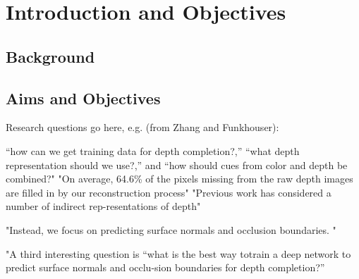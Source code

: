 

\chapter{Introduction and Objectives}
\label{Intro} 
\lipsum[1]


\section{Background}
\lipsum[1]


\section{Aims and Objectives}
Research questions go here, e.g. (from Zhang and Funkhouser):  
 
 “how can we get training data for depth completion?,”  “what depth representation should we use?,” and “how should cues from color and depth be combined?" 
 "On average, 64.6\% of the pixels missing from the raw depth images are filled in by our reconstruction process"
 "Previous work has considered a number of indirect rep-resentations  of  depth"  
  
 "Instead,  we  focus  on  predicting  surface  normals  and occlusion  boundaries. "  
 
 "A third interesting question is “what is the best way totrain a deep network to predict surface normals and occlu-sion boundaries for depth completion?” 
  
